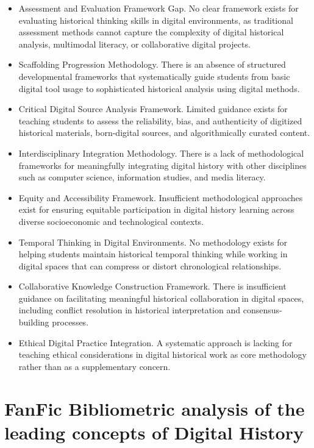 \begin{itemize}
  \item Assessment and Evaluation Framework Gap. No clear framework exists for evaluating historical thinking skills in digital environments, as traditional assessment methods cannot capture the complexity of digital historical analysis, multimodal literacy, or collaborative digital projects.
  \item Scaffolding Progression Methodology. There is an absence of structured developmental frameworks that systematically guide students from basic digital tool usage to sophisticated historical analysis using digital methods.
  \item  Critical Digital Source Analysis Framework. Limited guidance exists for teaching students to assess the reliability, bias, and authenticity of digitized historical materials, born-digital sources, and algorithmically curated content.
  \item Interdisciplinary Integration Methodology. There is a lack of methodological frameworks for meaningfully integrating digital history with other disciplines such as computer science, information studies, and media literacy.
    \item Equity and Accessibility Framework. Insufficient methodological approaches exist for ensuring equitable participation in digital history learning across diverse socioeconomic and technological contexts.
    \item Temporal Thinking in Digital Environments. No methodology exists for helping students maintain historical temporal thinking while working in digital spaces that can compress or distort chronological relationships.
    \item Collaborative Knowledge Construction Framework. There is insufficient guidance on facilitating meaningful historical collaboration in digital spaces, including conflict resolution in historical interpretation and consensus-building processes.
    \item Ethical Digital Practice Integration. A systematic approach is lacking for teaching ethical considerations in digital historical work as core methodology rather than as a supplementary concern.
\end{itemize}


\section{FanFic Bibliometric analysis of the leading concepts of Digital History}

